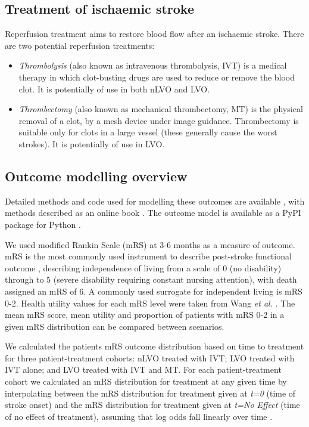 \subsection{Treatment of ischaemic stroke}

Reperfusion treatment aims to restore blood flow after an ischaemic stroke. There are two potential reperfusion treatments:

\begin{itemize}
    \item \textit{Thrombolysis} (also known as intravenous thrombolysis, IVT) is a medical therapy in which clot-busting drugs are used to reduce or remove the blood clot. It is potentially of use in both nLVO and LVO.
    
    \item \textit{Thrombectomy} (also known as mechanical thrombectomy, MT) is the physical removal of a clot, by a mesh device under image guidance. Thrombectomy is suitable only for clots in a large vessel (these generally cause the worst strokes). It is potentially of use in LVO.
\end{itemize}


\subsection{Outcome modelling overview}

Detailed methods and code used for modelling these outcomes are available \cite{github2}, with methods described as an online book \cite{github3}. The outcome model is available as a PyPI package for Python \cite{pypi}.

We used modified Rankin Scale (mRS) at 3-6 months as a measure of outcome. mRS is the most commonly used instrument to describe post-stroke functional outcome \cite{quinn_functional_2009}, describing independence of living from a scale of 0 (no disability) through to 5 (severe disability requiring constant nursing attention), with death assigned an mRS of 6. A commonly used surrogate for independent living is  mRS 0-2. Health utility values for each mRS level were taken from Wang \textit{et al.} \cite{wang_utility-weighted_2020}. The mean mRS score, mean utility and proportion of patients with mRS 0-2 in a given mRS distribution can be compared between scenarios.

We calculated the patients mRS outcome distribution based on time to treatment for three patient-treatment cohorts: nLVO treated with IVT; LVO treated with IVT alone; and LVO treated with IVT and MT. For each patient-treatment cohort we calculated an mRS distribution for treatment at any given time by interpolating between the mRS distribution for treatment given at \emph{t=0} (time of stroke onset) and the mRS distribution for treatment given at \emph{t=No Effect} (time of no effect of treatment), assuming that log odds fall linearly over time \cite{emberson_effect_2014, fransen_time_2016}.


